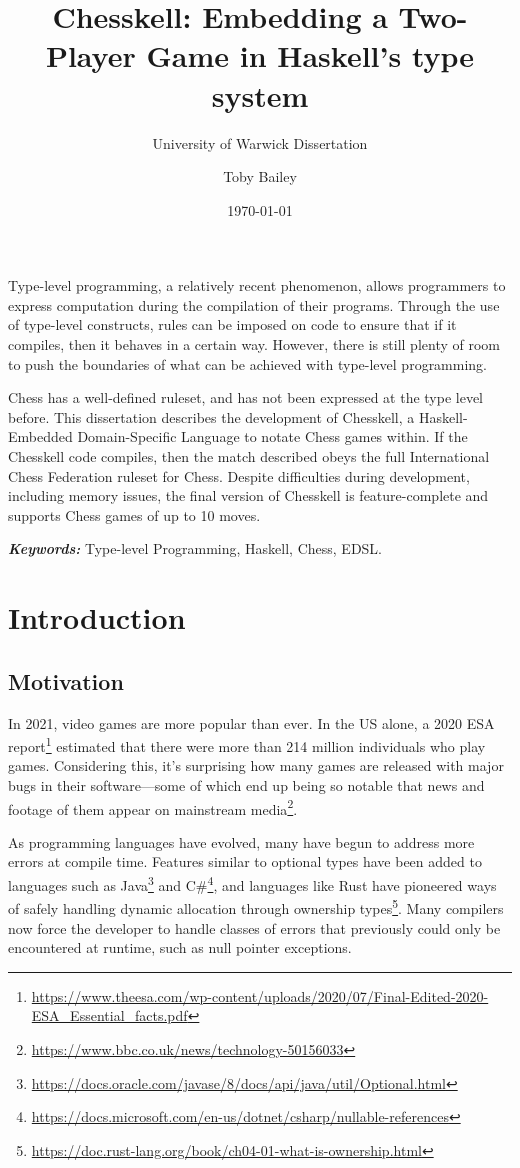 \documentclass[12pt, a4paper, bibliography=totocnumbered]{scrreprt}
\title{Chesskell: Embedding a Two-Player Game in Haskell's type system}
\subtitle{University of Warwick Dissertation}
\author{Toby Bailey}
\date{\today}
\renewenvironment{abstract}
 {\small
  \begin{center}
  \bfseries \textit{\abstractname}\vspace{-.5em}\vspace{0pt}
  \end{center}
  \quotation}
 {\endquotation}
\begin{document}
\begin{titlepage}
    \maketitle
    \tableofcontents
\end{titlepage}

\begin{abstract}
    Type-level programming, a relatively recent phenomenon, allows programmers to express computation during the compilation of their programs. Through the use of type-level constructs, rules can be imposed on code to ensure that if it compiles, then it behaves in a certain way. However, there is still plenty of room to push the boundaries of what can be achieved with type-level programming.

    Chess has a well-defined ruleset, and has not been expressed at the type level before. This dissertation describes the development of Chesskell, a Haskell-Embedded Domain-Specific Language to notate Chess games within. If the Chesskell code compiles, then the match described obeys the full International Chess Federation ruleset for Chess. Despite difficulties during development, including memory issues, the final version of Chesskell is feature-complete and supports Chess games of up to 10 moves.

    \textbf{\textit{Keywords:}} Type-level Programming, Haskell, Chess, EDSL.
\end{abstract}

\part{Introduction}

\chapter{Motivation}

In 2021, video games are more popular than ever. In the US alone, a 2020 ESA report\footnote{\url{https://www.theesa.com/wp-content/uploads/2020/07/Final-Edited-2020-ESA_Essential_facts.pdf}} estimated that there were more than 214 million individuals who play games. Considering this, it's surprising how many games are released with major bugs in their software---some of which end up being so notable that news and footage of them appear on mainstream media\footnote{\url{https://www.bbc.co.uk/news/technology-50156033}}.

As programming languages have evolved, many have begun to address more errors at compile time. Features similar to optional types have been added to languages such as Java\footnote{\url{https://docs.oracle.com/javase/8/docs/api/java/util/Optional.html}} and C\#\footnote{\url{https://docs.microsoft.com/en-us/dotnet/csharp/nullable-references}}, and languages like Rust have pioneered ways of safely handling dynamic allocation through ownership types\footnote{\url{https://doc.rust-lang.org/book/ch04-01-what-is-ownership.html}}. Many compilers now force the developer to handle classes of errors that previously could only be encountered at runtime, such as null pointer exceptions.
\end{document}
